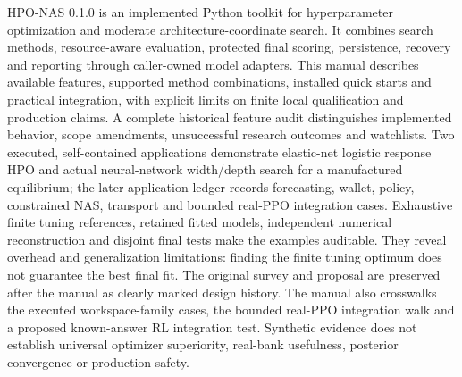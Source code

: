 HPO-NAS 0.1.0 is an implemented Python toolkit for hyperparameter optimization
and moderate architecture-coordinate search. It combines search methods,
resource-aware evaluation, protected final scoring, persistence, recovery and
reporting through caller-owned model adapters. This manual describes available
features, supported method combinations, installed quick starts and practical
integration, with explicit limits on finite local qualification and production
claims. A complete historical feature audit distinguishes implemented behavior,
scope amendments, unsuccessful research outcomes and watchlists. Two executed,
self-contained applications demonstrate elastic-net logistic response HPO and
actual neural-network width/depth search for a manufactured equilibrium; the
later application ledger records forecasting, wallet, policy, constrained NAS,
transport and bounded real-PPO integration cases.
Exhaustive finite tuning references, retained fitted models, independent
numerical reconstruction and disjoint final tests make the examples auditable.
They reveal overhead and generalization limitations: finding the finite tuning
optimum does not guarantee the best final fit. The original survey and proposal
are preserved after the manual as clearly marked design history. The manual
also crosswalks the executed workspace-family cases, the bounded real-PPO
integration walk and a proposed known-answer RL integration test. Synthetic
evidence does not establish universal optimizer superiority, real-bank
usefulness, posterior convergence or production safety.
